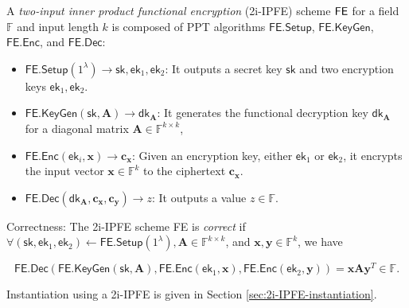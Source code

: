 \begin{definition}
\label{def:2i-IPFE}
	A \emph{two-input inner product functional encryption} (2i-IPFE) scheme $\sf FE$ for a field $\mathbb{F}$ and input length $k$ is composed of PPT algorithms $\textsf{FE.Setup}$, $\textsf{FE.KeyGen}$, $\textsf{FE.Enc}$, and $\textsf{FE.Dec}$:

	\begin{itemize}
	
		\item $\textsf{FE.Setup}(1^\lambda) \to \textsf{sk}, \textsf{ek}_1, \textsf{ek}_2$: It outputs a secret key $\textsf{sk}$ and two encryption keys $\textsf{ek}_1, \textsf{ek}_2$.
	
		\item $\textsf{FE.KeyGen}(\textsf{sk}, \mathbf{A}) \to \textsf{dk}_\mathbf{A}$: It generates the functional decryption key $\textsf{dk}_\mathbf{A}$ for a diagonal matrix $\mathbf{A} \in \mathbb{F}^{k \times k}$,  
	
		\item $\textsf{FE.Enc}(\textsf{ek}_i, \mathbf{x}) \to \mathbf{c_x}$: Given an encryption key, either $\textsf{ek}_1$ or $\textsf{ek}_2$, it encrypts the input vector $\mathbf{x} \in \mathbb{F}^k$ to the ciphertext $\mathbf{c_x}$. 
	
		\item $\textsf{FE.Dec}(\textsf{dk}_\mathbf{A}, \mathbf{c_x}, \mathbf{c_y}) \to z$: It outputs a value $z \in \mathbb{F}$.
	
	\end{itemize}
	
	\noindent Correctness: The 2i-IPFE scheme \textsf{FE} is \emph{correct} if $\forall (\textsf{sk}, \textsf{ek}_1, \textsf{ek}_2) \gets \textsf{FE.Setup}(1^\lambda), \mathbf{A} \in \mathbb{F}^{k \times k}$, and $\mathbf{x}, \mathbf{y} \in \mathbb{F}^k$, we have

	\[
		\textsf{FE.Dec}(\textsf{FE.KeyGen}(\textsf{sk},  \mathbf{A}), \textsf{FE.Enc}(\textsf{ek}_1, \mathbf{x}), \textsf{FE.Enc}(\textsf{ek}_2, \mathbf{y}) ) = \mathbf{x} \mathbf{A} \mathbf{y}^T \in \mathbb{F}.
	\]

\end{definition}

Instantiation using a 2i-IPFE is given in Section \ref{sec:2i-IPFE-instantiation}.

